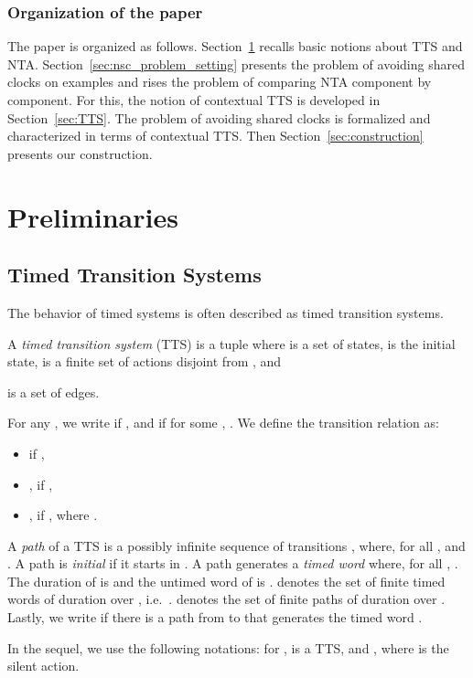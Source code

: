 \documentclass{LMCS}
\theoremstyle{plain}\newtheorem*{prop11}{Proposition~\ref{prop:states} bis}
\begin{document}
\subsubsection*{Organization of the paper}
The paper is organized as follows. Section~\ref{sec:preliminaries} recalls basic
notions about TTS and NTA\@. Section~\ref{sec:nsc_problem_setting} presents the
problem of avoiding shared clocks on examples and rises the problem of comparing
NTA component by component. For this, the notion of contextual TTS is developed
in Section~\ref{sec:TTS}. The problem of avoiding shared clocks is formalized
and characterized in terms of contextual TTS\@. Then
Section~\ref{sec:construction} presents our construction.




\section{Preliminaries}\label{sec:preliminaries}                               \subsection{Timed Transition Systems}
The behavior of timed systems is often described as timed transition systems.
\begin{defi}A \emph{timed transition system} (TTS)
  is a tuple \mbox{}
  where
   is a set of states,
   is the initial state,
   is a finite set of actions disjoint from , and
  
  is a set of edges.
\end{defi}
For any , we write  if
\mbox{}, and  if for some ,
\mbox{}. We define the transition relation  as:
\begin{itemize}
  \item  if ,
  \item ,
   if ,
  \item ,
   if , where
  .
\end{itemize}


A \emph{path} of a TTS is a possibly infinite sequence of transitions
, where, for all ,
 and .
A path is \emph{initial} if it starts in .
A path  generates a
\emph{timed word} \mbox{} where, for
all , . The duration of  is
 and the untimed word of  is
.  denotes the set of finite timed words of duration 
over , i.e.\ .  denotes the set of finite paths of duration 
over .
Lastly, we write  if there is a path from  to 
that generates the timed word .

In the sequel, we use the following notations: for ,
 is a TTS, and
, where 
is the silent action.
\end{document}
